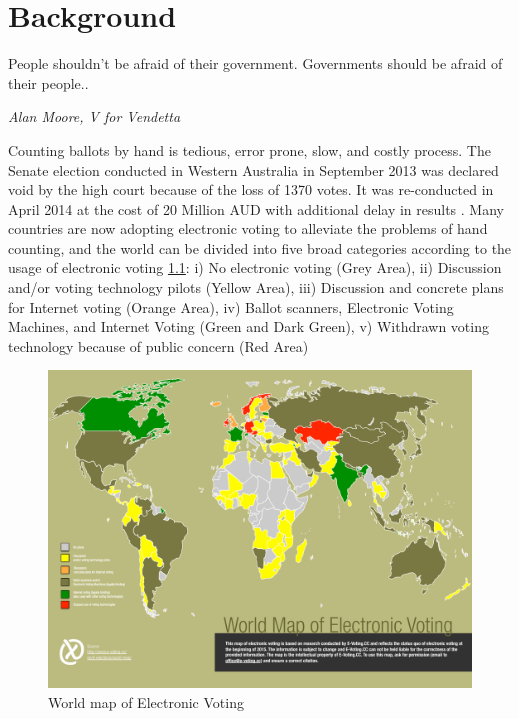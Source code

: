 \chapter{Background}
\label{cha:background}

\epigraph{People shouldn't be afraid of their government. Governments should be afraid of their people..} 
{\textit{Alan Moore, V for Vendetta }}
  Counting ballots by hand is tedious, error prone, slow, and costly process. 
  The Senate election conducted in Western Australia in September 2013 was 
  declared void by the high court because of the loss of 1370 votes. It was 
  re-conducted in April 2014 at the cost of 20 Million 
  AUD with additional  delay in results \citep{Aussentate}. Many countries 
  are now adopting electronic voting to alleviate the problems of hand counting, and 
  the world can be divided into five broad categories according to 
  the usage of electronic voting \citep{Evoting} \ref{fig:world_electronic_voting_map}: i) No electronic 
  voting (Grey Area), ii)
  Discussion and/or voting technology pilots (Yellow Area), 
  iii) Discussion and concrete plans for Internet voting (Orange Area),
  iv) Ballot scanners, Electronic Voting Machines, and Internet Voting (Green and Dark Green),
  v) Withdrawn voting technology because of public concern (Red Area) 
    \begin{figure}[htb]
	\begin{center}
	\includegraphics[scale=0.5]{e-voting_worldmap_2015.pdf}
	\caption{World map of Electronic Voting}
	\label{fig:world_electronic_voting_map}
	\end{center}
  \end{figure}  
 
